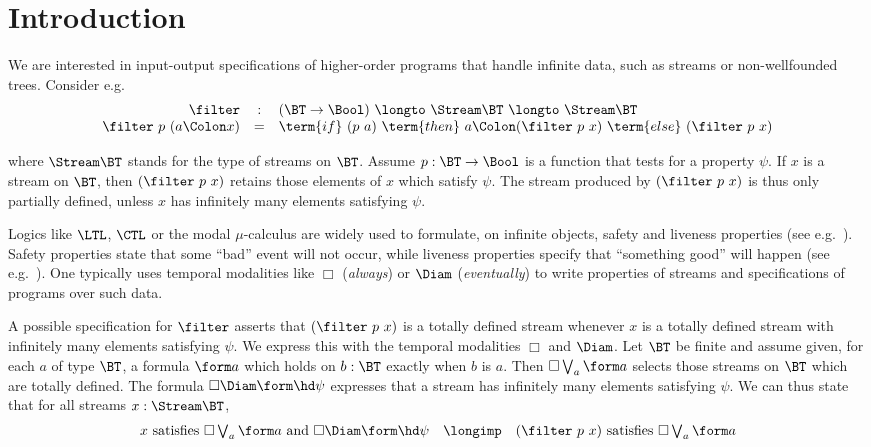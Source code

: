 \section{Introduction}
\label{sec:intro}


\noindent
We are interested in input-output
specifications of higher-order programs that handle infinite 
data, such as streams or non-wellfounded trees.
Consider e.g.
\[
\begin{array}{r c l}
  \filter
& :
& (\BT \to \Bool)
  ~\longto~
  \Stream \BT
  ~\longto~
  \Stream \BT
\\

  \filter\ p\ (a \Colon x)
& =
& \term{if}~ (p\ a)
  ~\term{then}~ a \Colon (\filter\ p\ x)
  ~\term{else}~ (\filter\ p\ x)
\end{array}
\]

\noindent
where $\Stream\BT$ stands for the type of streams on $\BT$.
Assume $p : \BT \to \Bool$ is a function that
tests for a property $\psi$.
If $x$ is a stream on $\BT$,
then $(\filter\ p\ x)$ retains those elements of $x$ which satisfy $\psi$.
The stream produced by $(\filter\ p\ x)$ is thus only partially defined,
unless $x$ has infinitely many elements satisfying $\psi$.

Logics like $\LTL$, $\CTL$ or the modal $\mu$-calculus are
widely used to formulate, on infinite objects,
safety and liveness properties (see e.g.~\cite{hr07chapter,bs07chapter}).
Safety properties state that
some ``bad'' event will not occur,
while liveness properties 
specify that ``something good'' will happen 
(see e.g.~\cite{bk08book}).
One typically uses
temporal modalities like $\Box$
(\emph{always})
or $\Diam$
(\emph{eventually})
to write properties of streams and specifications of programs over such data.


A possible specification for $\filter$
asserts that $(\filter\ p \ x)$ is a totally defined stream whenever
$x$ is a totally defined stream with infinitely many elements satisfying $\psi$.
We express this with the temporal modalities $\Box$ and $\Diam$.
Let $\BT$ be finite and assume given,
for each $a$ of type $\BT$,
a formula $\form a$ which holds on $b : \BT$
exactly when $b$ is $a$.
Then $\Box \bigvee_a \form a$
selects those streams on $\BT$
which are totally defined.
The formula $\Box\Diam \form\hd\psi$ expresses that a stream
has infinitely many elements satisfying $\psi$.
We can thus state that for all streams $x : \Stream\BT$,
\begin{equation}
\label{eq:intro:spec}
\begin{array}{c}
  \text{$x$ satisfies $\Box\bigvee_a \form a$ and $\Box\Diam \form\hd\psi$}
  \quad\longimp\quad
  \text{$(\filter\ p\ x)$ satisfies $\Box\bigvee_a \form a$}
\end{array}
\end{equation}


